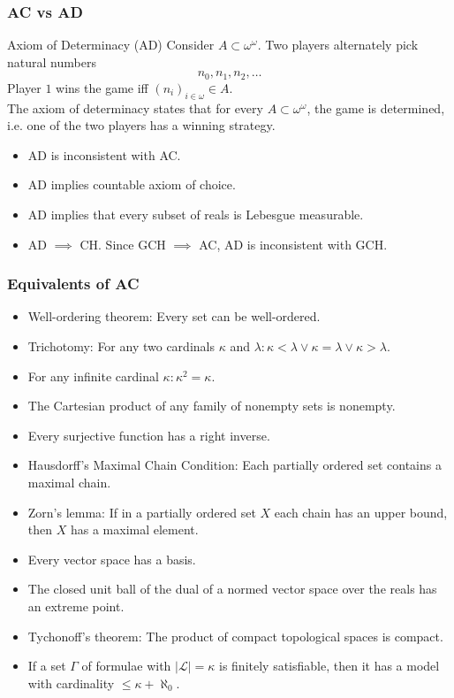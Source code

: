 \documentclass[UTF8,aspectratio=43,11pt,colorlinks,compress,openany]{beamer}%
\begin{document}
\begin{frame}\frametitle{AC vs AD}
\setlength\abovedisplayskip{0pt}
\setlength\belowdisplayskip{0pt}
	\begin{block}{Axiom of Determinacy (AD)}
		Consider $A\subset\omega^\omega$. Two players alternately pick natural numbers
		\[n_0,n_1,n_2,\ldots\]
		Player $1$ wins the game iff $(n_i)_{i\in\omega}\in A$.\\
		The axiom of determinacy states that for every $A\subset\omega^\omega$, the game is determined, i.e. one of the two players has a winning strategy.
	\end{block}
	\vspace{7pt}
	\begin{itemize}
		\item AD is inconsistent with AC.
		\item AD implies countable axiom of choice.
		\item AD implies that every subset of reals is Lebesgue measurable.
		\item AD $\implies$ CH. Since GCH $\implies$ AC, AD is inconsistent with GCH.
	\end{itemize}
\end{frame}

\begin{frame}\frametitle{Equivalents of AC}
\begin{itemize}
				\item Well-ordering theorem: Every set can be well-ordered.
				\item Trichotomy: For any two cardinals $\kappa$ and $\lambda: \kappa<\lambda\vee\kappa=\lambda\vee \kappa>\lambda$.
				\item For any infinite cardinal $\kappa: \kappa^2=\kappa$.
				\item The Cartesian product of any family of nonempty sets is nonempty.
				\item Every surjective function has a right inverse.
				\item Hausdorff's Maximal Chain Condition: Each partially ordered set contains a maximal chain.
				\item Zorn's lemma: If in a partially ordered set $X$ each chain has an upper bound, then $X$ has a maximal element.
				\item Every vector space has a basis.
				\item The closed unit ball of the dual of a normed vector space over the reals has an extreme point.
				\item Tychonoff's theorem: The product of compact topological spaces is compact.
				\item If a set $\Gamma$ of formulae with $|\mathscr{L}|=\kappa$ is finitely satisfiable, then it has a model with cardinality $\leq \kappa+\aleph_0$.
\end{itemize}
\end{frame}
\end{document}
